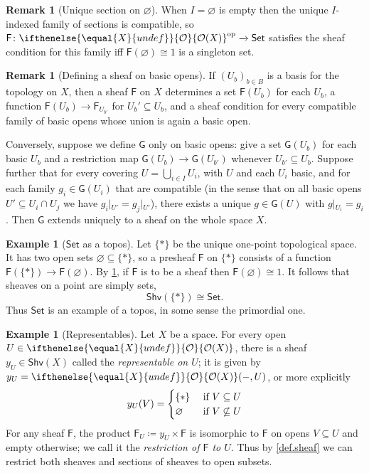\documentclass[reqno,11pt]{amsproc}
\theoremstyle{plain}
\theoremstyle{definition}
\newtheorem{example}[theorem]{Example}
\newtheorem{remark}[theorem]{Remark}
\newcommand{\cat}[1]{\mathsf{#1}}
\newcommand{\fun}[1]{\mathsf{#1}}
\newcommand{\sheaf}[1]{\fun{#1}}
\newcommand{\op}{^\mathrm{op}}
\newcommand{\Set}{\cat{Set}}
\renewcommand{\to}[1][]{\xrightarrow{#1}}
\newcommand{\tn}[1]{\textnormal{#1}}
\newcommand{\shv}{\cat{Shv}}
\newcommand{\Op}[1][undef]{\ifthenelse{\equal{#1}{undef}}{\mathcal{O}}{\mathcal{O}(#1)}}
\newcommand{\rest}[2]{#1\big|\hspace{0in}_{#2}}
\numberwithin{equation}{section}
\begin{document}
\begin{remark}[Unique section on $\varnothing$]\label{rem.unique_sec_empty}
When $I=\varnothing$ is empty then the unique $I$-indexed family of sections is compatible, so $\cat{F}\colon\Op[X]\op\to\Set$ satisfies the sheaf condition for this family iff $\sheaf{F}(\varnothing)\cong 1$ is a singleton set.
\end{remark}

\begin{remark}[Defining a sheaf on basic opens]
If $(U_b)_{b\in B}$ is a basis for the topology on $X$, then a sheaf $\sheaf{F}$ on $X$ determines a set $\sheaf{F}(U_b)$ for each $U_b$, a function $\sheaf{F}(U_b)\to\sheaf{F}_{U_{b'}}$ for $U_b'\subseteq U_b$, and a sheaf condition for every compatible family of basic opens whose union is again a basic open. 

Conversely, suppose we define $\sheaf{G}$ only on basic opens: give a set $\sheaf{G}(U_b)$ for each basic $U_b$ and a restriction map $\sheaf{G}(U_b)\to\sheaf{G}(U_{b'})$ whenever $U_{b'}\subseteq U_b$. Suppose further that for every covering $U=\bigcup_{i\in I}U_i$, with $U$ and each $U_i$ basic, and for each family $g_i\in\sheaf{G}(U_i)$ that are compatible (in the sense that on all basic opens $U'\subseteq U_i\cap U_j$ we have $\rest{g_i}{U'}=\rest{g_j}{U'}$), there exists a unique $g\in \sheaf{G}(U)$ with $\rest{g}{U_i}=g_i$. Then $\sheaf{G}$ extends uniquely to a sheaf on the whole space $X$.
\end{remark}

\begin{example}[$\Set$ as a topos]\label{ex.set_topos}
Let $\{*\}$ be the unique one-point topological space. It has two open sets $\varnothing\subseteq\{*\}$, so a presheaf $\sheaf{F}$ on $\{*\}$ consists of a function $\sheaf{F}(\{*\})\to\sheaf{F}(\varnothing)$. By \cref{rem.unique_sec_empty}, if $\sheaf{F}$ is to be a sheaf then $\sheaf{F}(\varnothing)\cong 1$. It follows that sheaves on a point are simply sets,
\[
\shv(\{*\})\cong\Set.
\]
Thus $\Set$ is an example of a topos, in some sense the primordial one.
\end{example}

\begin{example}[Representables]\label{ex.representable_sheaf}
Let $X$ be a space. For every open $U\in\Op[X]$, there is a sheaf $y_U\in\shv(X)$ called the \emph{representable on $U$}; it is given by $y_U=\Op[X](-,U)$, or more explicitly
\[
	y_U(V)=
	\begin{cases}
	\{*\}&\tn{ if }V\subseteq U\\
	\varnothing&\tn{ if }V\not\subseteq U
	\end{cases}
\]
For any sheaf $\sheaf{F}$, the product $\sheaf{F}_U\coloneqq y_U\times\sheaf{F}$ is isomorphic to $\sheaf{F}$ on opens $V\subseteq U$ and empty otherwise; we call it the \emph{restriction of $\sheaf{F}$ to $U$}. Thus by \cref{def.sheaf} we can restrict both sheaves and sections of sheaves to open subsets.
\end{example}
\end{document}
